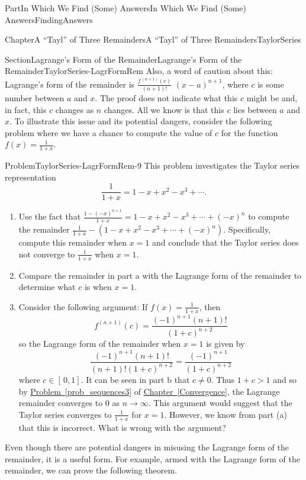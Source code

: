 \documentclass[oneside,10pt,]{book}
\newcommand{\xreffont}{\relax}
\numberwithin{equation}{part}
\begin{document}
\begin{partptx}{Part}{In Which We Find (Some) Answers}{}{In Which We Find (Some) Answers}{}{}{FindingAnswers}
\begin{chapterptx}{Chapter}{A ``Tayl'' of Three Remainders}{}{A ``Tayl'' of Three Remainders}{}{}{TaylorSeries}
\begin{sectionptx}{Section}{Lagrange's Form of the Remainder}{}{Lagrange's Form of the Remainder}{}{}{TaylorSeries-LagrFormRem}
Also, a word of caution about this: Lagrange's form of the remainder is \(\frac{f^{\,(n+1)}(c)}{(n+1)!}\) \((x-a)^{n+1}\), where \(c\) is some number between \(a\) and \(x\).  The proof does not indicate what this \(c\) might be and, in fact, this \(c\) changes as \(n\) changes. All we know is that this \(c\) lies between \(a\) and \(x\).  To illustrate this issue and its potential dangers, consider the following problem where we have a chance to compute the value of \(c\) for the function \(f(x)=\frac{1}{1+x}\).%
\begin{problem}{Problem}{}{TaylorSeries-LagrFormRem-9}%
This problem investigates the Taylor series representation%
\begin{equation*}
\frac{1}{1+x}=1-x+x^2-x^3+\cdots\text{.}
\end{equation*}
%
\begin{enumerate}[font=\bfseries,label=(\alph*),ref=\alph*]%
\item{}Use the fact that \(\frac{1-(-x)^{n+1}}{1+x}=1-x+x^2-x^3+\cdots+(-x)^n\) to compute the remainder \(\frac{1}{1+x}-\left(1-x+x^2-x^3+\cdots+(-x)^n\right)\). Specifically, compute this remainder when \(x=1\) and conclude that the Taylor series does not converge to \(\frac{1}{1+x}\) when \(x=1\).%
\item{}Compare the remainder in part a with the Lagrange form of the remainder to determine what \(c\) is when \(x=1\).%
\item{}Consider the following argument: If \(f(x)=\frac{1}{1+x}\), then%
\begin{equation*}
f^{(n+1)}(c)=\frac{(-1)^{n+1}(n+1)!}{(1+c)^{n+2}}
\end{equation*}
so the Lagrange form of the remainder when \(x=1\) is given by%
\begin{equation*}
\frac{(-1)^{n+1}(n+1)!}{(n+1)!(1+c)^{n+2}}=\frac{(-1)^{n+1}}{(1+c)^{n+2}}
\end{equation*}
where \(c\in[\,0,1]\).  It can be seen in part b that \(c\neq 0\).  Thus \(1+c>1\) and so by \hyperref[prob_sequences3]{Problem~{\xreffont\ref{prob_sequences3}}} of \hyperref[Convergence]{Chapter~{\xreffont\ref{Convergence}}}, the Lagrange remainder converges to \(0\) as \(n\rightarrow\infty\).  This argument would suggest that the Taylor series converges to \(\frac{1}{1+x}\) for \(x=1\).  However, we know from part (a) that this is incorrect.  What is wrong with the argument?%
\end{enumerate}%
\end{problem}
Even though there are potential dangers in misusing the Lagrange form of the remainder, it is a useful form.  For example, armed with the Lagrange form of the remainder, we can prove the following theorem.%

\end{sectionptx}
\end{chapterptx}
\end{partptx}
\end{document}

